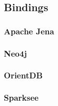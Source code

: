 \subsection{Bindings}

\subsubsection{Apache Jena}

\subsubsection{Neo4j}

\subsubsection{OrientDB}

\subsubsection{Sparksee}
